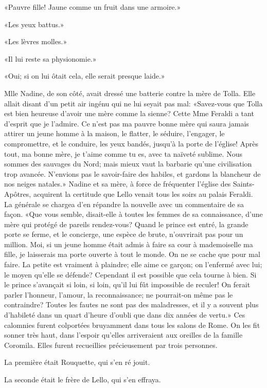 «Pauvre fille! Jaune comme un fruit dans une armoire.»

«Les yeux battus.»

«Les lèvres molles.»

«Il lui reste sa physionomie.»

«Oui; si on lui ôtait cela, elle serait presque laide.»

Mlle Nadine, de son côté, avait dressé une batterie contre la mère de
Tolla. Elle allait disant d'un petit air ingénu qui ne lui seyait pas
mal: «Savez-vous que Tolla est bien heureuse d'avoir une mère comme la
sienne? Cette Mme Feraldi a tant d'esprit que je l'admire. Ce n'est pas
ma pauvre bonne mère qui saura jamais attirer un jeune homme à la
maison, le flatter, le séduire, l'engager, le compromettre, et le
conduire, les yeux bandés, jusqu'à la porte de l'église! Après tout, ma
bonne mère, je t'aime comme tu es, avec ta naïveté sublime. Nous sommes
des sauvages du Nord; mais mieux vaut la barbarie qu'une civilisation
trop avancée. N'envions pas le savoir-faire des habiles, et gardons la
blancheur de nos neiges natales.» Nadine et sa mère, à force de
fréquenter l'église des Saints-Apôtres, acquirent la certitude que Lello
venait tous les soirs au palais Feraldi. La générale se chargea d'en
répandre la nouvelle avec un commentaire de sa façon. «Que vous semble,
disait-elle à toutes les femmes de sa connaissance, d'une mère qui
protégé de pareils rendez-vous? Quand le prince est entré, la grande
porte se ferme, et le concierge, une espèce de brute, n'ouvrirait pas
pour un million. Moi, si un jeune homme était admis à faire sa cour à
mademoiselle ma fille, je laisserais ma porte ouverte à tout le monde.
On ne se cache que pour mal faire. La petite est vraiment à plaindre;
elle aime ce garçon; on l'enfermé avec lui; le moyen qu'elle se défende?
Cependant il est possible que cela tourne à bien. Si le prince
s'avançait si loin, si loin, qu'il lui fût impossible de reculer! On
ferait parler l'honneur, l'amour, la reconnaissance; ne pourrait-on même
pas le contraindre? Toutes les fautes ne sont pas des maladresses, et il
y a souvent plus d'habileté dans un quart d'heure d'oubli que dans dix
années de vertu.» Ces calomnies furent colportées bruyamment dans tous
les salons de Rome. On les fit sonner très haut, dans l'espoir qu'elles
arriveraient aux oreilles de la famille Coromila. Elles furent
recueillies précieusement par trois personnes.

La première était Rouquette, qui s'en ré jouit.

La seconde était le frère de Lello, qui s'en effraya.

